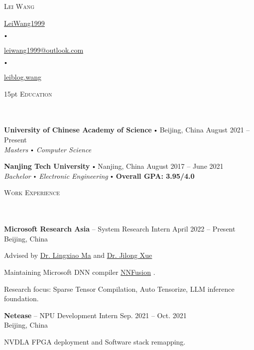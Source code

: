 \documentclass{article}
\newcommand{\contact}[3]{
\vspace*{5pt}
\begin{center}
{\LARGE \scshape {#1}}\\
\vspace{3pt}
#2 
\vspace{2pt}
#3
\end{center}
\vspace*{-8pt}
}
\newcommand{\header}[1]{{
\hspace*{-15pt}\vspace*{6pt} \textsc{#1}} \vspace*{-6pt} 
\lineunder
}
\newcommand{\lineunder}{
\vspace*{-8pt} \\ \hspace*{-18pt} 
\hrulefill \\
}
\newcommand{\school}[4]{
\textbf{#1} \labelitemi #2 \hfill #3 \\ #4 \vspace*{5pt}
}
\newcommand{\employer}[4]{{
\vspace*{2pt}%
\textbf{#1} #2 \hfill #3\\ #4 \vspace*{2pt}}
}
\renewcommand{\labelitemi}{
$\vcenter{\hbox{\tiny$\bullet$}}$\hspace*{3pt}
}
\renewcommand{\labelitemii}{
$\vcenter{\hbox{\tiny$\bullet$}}$\hspace*{-3pt}
}
\newcommand{\myhref}[2]{%
\href{#1}{\textcolor{ColorTwo}{#2}}
}
\newenvironment{bullet-list-minor}{
\begin{list}{\labelitemii}{\setlength\leftmargin{15pt} 
\topsep 0pt \itemsep -2pt}}{\vspace*{4pt}\end{list}
}
\begin{document}
\small
\smallskip
\vspace*{-44pt}

\contact{Lei Wang}
{
\textcolor{ColorTwo}{\faGithub} 
\myhref{https://github.com/LeiWang1999}{LeiWang1999} 
\labelitemi 
\textcolor{ColorTwo}{\faEnvelopeO} 
\myhref{mailto:leiwang1999@outlook.com}{leiwang1999@outlook.com}
\labelitemi
\textcolor{ColorTwo}{\faChain} 
\myhref{https://leiblog.wang}{leiblog.wang}
}

\vspace{15pt}
\header{Education}
    \school{University of Chinese Academy of Science}{Beijing, China}{August 2021 -- Present}
    {\textit{Masters \labelitemi Computer Science}}

    \school{Nanjing Tech University}{Nanjing, China}{August 2017 -- June 2021}
    {\textit{Bachelor \labelitemi Electronic Engineering} \labelitemi \textcolor{ColorOne}{\textbf{Overall GPA: 3.95/4.0}}}

\vspace*{4pt}%
\header{Work Experience}
    \employer{Microsoft Research Asia}{-- System Research Intern}{April 2022 -- Present}{Beijing, China}
	\begin{bullet-list-minor}
	\item Advised by \myhref{https://xysmlx.github.io/}{Dr. Lingxiao Ma} and \myhref{https://www.microsoft.com/en-us/research/people/jxue/}{Dr. Jilong Xue}
	\item Maintaining Microsoft DNN compiler \myhref{https://github.com/microsoft/nnfusion}{NNFusion}.
	\item Research focus: Sparse Tensor Compilation, Auto Tensorize, LLM inference foundation.   
    \end{bullet-list-minor}

    \employer{Netease}{-- NPU Development Intern}{Sep. 2021 -- Oct. 2021}{Beijing, China}
	\begin{bullet-list-minor}
	\item NVDLA FPGA deployment and Software stack remapping.
    \end{bullet-list-minor}
\end{document}
